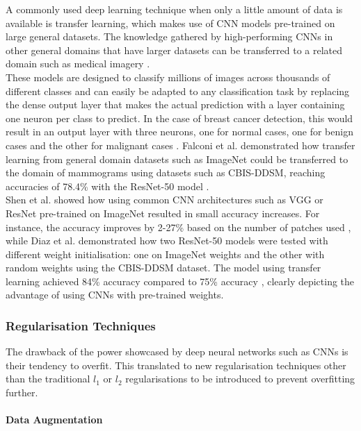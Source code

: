 A commonly used deep learning technique when only a little amount of data is available is transfer learning, which makes use of CNN models pre-trained on large general datasets. The knowledge gathered by high-performing CNNs in other general domains that have larger datasets can be transferred to a related domain such as medical imagery \citep{Falconi2019}.\\

These models are designed to classify millions of images across thousands of different classes and can easily be adapted to any classification task by replacing the dense output layer that makes the actual prediction with a layer containing one neuron per class to predict. In the case of breast cancer detection, this would result in an output layer with three neurons, one for normal cases, one for benign cases and the other for malignant cases \citep{Geron2019}. Falconi et al. demonstrated how transfer learning from general domain datasets such as ImageNet could be transferred to the domain of mammograms using datasets  such as CBIS-DDSM, reaching accuracies of 78.4\% with the ResNet-50 model \citep{Falconi2019}.\\

Shen et al. showed how using common CNN architectures such as VGG or ResNet pre-trained on ImageNet resulted in small accuracy increases. For instance, the accuracy improves by 2-27\% based on the number of patches used \citep{Shen2017}, while Diaz et al. demonstrated how two ResNet-50 models were tested with different weight initialisation: one on ImageNet weights and the other with random weights using the CBIS-DDSM dataset. The model using transfer learning achieved  84\% accuracy compared to 75\% accuracy \citep{Diaz2018}, clearly depicting the advantage of using CNNs with pre-trained weights. 

\subsubsection{Regularisation Techniques}

The drawback of the power showcased by deep neural networks such as CNNs is their tendency to overfit. This translated to new regularisation techniques other than the traditional $l_1$ or $l_2$ regularisations to be introduced to prevent overfitting further.

\paragraph{Data Augmentation}
\label{sec:litsurvey-data-augmentation}

